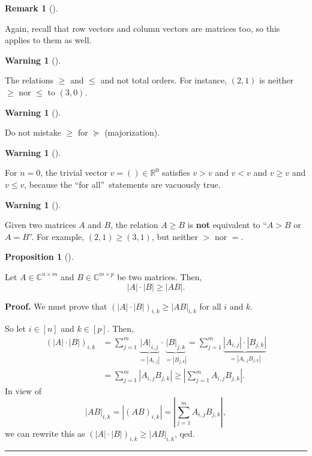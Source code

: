 \documentclass[numbers=enddot,12pt,final,onecolumn,notitlepage]{scrartcl}%
\numberwithin{exer}{subsection}
\theoremstyle{definition}
\newtheorem{prop}[theo]{Proposition}
\newenvironment{proposition}[1][]
{\begin{prop}[#1]\begin{leftbar}}
{\end{leftbar}\end{prop}}
\newtheorem{remk}[theo]{Remark}
\newenvironment{remark}[1][]
{\begin{remk}[#1]\begin{leftbar}}
{\end{leftbar}\end{remk}}
\newtheorem{warn}[theo]{Warning}
\newenvironment{warning}[1][]
{\begin{warn}[#1]\begin{leftbar}}
{\end{leftbar}\end{warn}}
\newenvironment{proof}[1][Proof]{\noindent\textbf{#1.} }{\ \rule{0.5em}{0.5em}}
\newenvironment{warning}[1][Warning]{\noindent\textbf{#1.} }{\ \rule{0.5em}{0.5em}}
\let\sumnonlimits\sum
\renewcommand{\sum}{\sumnonlimits\limits}
\begin{document}
\begin{remark}
Again, recall that row vectors and column vectors are matrices too, so this
applies to them as well.
\end{remark}

\begin{warning}
The relations $\geq$ and $\leq$ and not total orders. For instance, $\left(
2,1\right)  $ is neither $\geq$ nor $\leq$ to $\left(  3,0\right)  $.
\end{warning}

\begin{warning}
Do not mistake $\geq$ for $\succcurlyeq$ (majorization).
\end{warning}

\begin{warning}
For $n=0$, the trivial vector $v=\left(  {}\right)  \in\mathbb{R}^{0}$
satisfies $v>v$ and $v<v$ and $v\geq v$ and $v\leq v$, because the
\textquotedblleft for all\textquotedblright\ statements are vacuously true.
\end{warning}

\begin{warning}
Given two matrices $A$ and $B$, the relation $A\geq B$ is \textbf{not}
equivalent to \textquotedblleft$A>B$ or $A=B$\textquotedblright. For example,
$\left(  2,1\right)  \geq\left(  3,1\right)  $, but neither $>$ nor $=$.
\end{warning}

\begin{proposition}
Let $A\in\mathbb{C}^{n\times m}$ and $B\in\mathbb{C}^{m\times p}$ be two
matrices. Then,%
\[
\left\vert A\right\vert \cdot\left\vert B\right\vert \geq\left\vert
AB\right\vert .
\]

\end{proposition}

\begin{proof}
We must prove that $\left(  \left\vert A\right\vert \cdot\left\vert
B\right\vert \right)  _{i,k}\geq\left\vert AB\right\vert _{i,k}$ for all $i$
and $k$.

So let $i\in\left[  n\right]  $ and $k\in\left[  p\right]  $. Then,
\begin{align*}
\left(  \left\vert A\right\vert \cdot\left\vert B\right\vert \right)  _{i,k}
& =\sum_{j=1}^{m}\underbrace{\left\vert A\right\vert _{i,j}}_{=\left\vert
A_{i,j}\right\vert }\cdot\underbrace{\left\vert B\right\vert _{j,k}%
}_{=\left\vert B_{j,k}\right\vert }=\sum_{j=1}^{m}\underbrace{\left\vert
A_{i,j}\right\vert \cdot\left\vert B_{j,k}\right\vert }_{=\left\vert
A_{i,j}B_{j,k}\right\vert }\\
& =\sum_{j=1}^{m}\left\vert A_{i,j}B_{j,k}\right\vert \geq\left\vert
\sum_{j=1}^{m}A_{i,j}B_{j,k}\right\vert .
\end{align*}
In view of%
\[
\left\vert AB\right\vert _{i,k}=\left\vert \left(  AB\right)  _{i,k}%
\right\vert =\left\vert \sum_{j=1}^{m}A_{i,j}B_{j,k}\right\vert ,
\]
we can rewrite this as $\left(  \left\vert A\right\vert \cdot\left\vert
B\right\vert \right)  _{i,k}\geq\left\vert AB\right\vert _{i,k}$, qed.
\end{proof}
\end{document}
